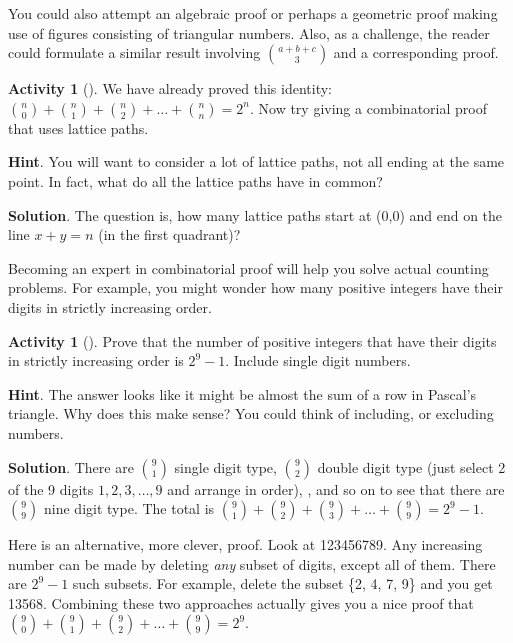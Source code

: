 \documentclass[10pt,]{book}
\theoremstyle{plain}
\theoremstyle{definition}
\theoremstyle{definition}
\theoremstyle{definition}
\newtheorem{activity}[project]{Activity}
\numberwithin{equation}{chapter}
\begin{document}
\hypertarget{p-686}{}%
You could also attempt an algebraic proof or perhaps a geometric proof making use of figures consisting of triangular numbers. Also, as a challenge, the reader could formulate a similar result involving \(\binom{a + b + c}{3}\) and a corresponding proof.%
\begin{activity}[]\label{activity-89}
\hypertarget{p-687}{}%
We have already proved this identity: \(\binom{n}{0} + \binom{n}{1} + \binom{n}{2} + \ldots + \binom{n}{n} = 2^{n}\).  Now try giving a combinatorial proof that uses lattice paths.%
\par\smallskip%
\noindent\textbf{Hint}.\hypertarget{hint-50}{}\quad%
\hypertarget{p-688}{}%
You will want to consider a lot of lattice paths, not all ending at the same point.  In fact, what do all the lattice paths have in common?%
\par\smallskip%
\noindent\textbf{Solution}.\hypertarget{solution-44}{}\quad%
\hypertarget{p-689}{}%
The question is, how many lattice paths start at (0,0) and end on the line \(x+y=n\) (in the first quadrant)?%
\end{activity}
\hypertarget{p-690}{}%
Becoming an expert in combinatorial proof will help you solve actual counting problems.  For example, you might wonder how many positive integers have their digits in strictly increasing order.%
\begin{activity}[]\label{activity-90}
\hypertarget{p-691}{}%
Prove that the number of positive integers that have their digits in strictly increasing order is \(2^{9} - 1\). Include single digit numbers.%
\par\smallskip%
\noindent\textbf{Hint}.\hypertarget{hint-51}{}\quad%
\hypertarget{p-692}{}%
The answer looks like it might be almost the sum of a row in Pascal's triangle.  Why does this make sense?  You could think of including, or excluding numbers.%
\par\smallskip%
\noindent\textbf{Solution}.\hypertarget{solution-45}{}\quad%
\hypertarget{p-693}{}%
There are \(\binom{9}{1}\) single digit type, \(\binom{9}{2}\) double digit type (just select 2 of the 9 digits \(1, 2, 3, \ldots, 9\) and arrange in order), \textellipsis{}, and so on to see that there are \(\binom{9}{9}\) nine digit type. The total is \(\binom{9}{1} + \binom{9}{2} + \binom{9}{3} + \ldots + \binom{9}{9} = 2^{9} - 1\).%
\par
\hypertarget{p-694}{}%
Here is an alternative, more clever, proof. Look at 123456789. Any increasing number can be made by deleting \emph{any} subset of digits, except all of them. There are \(2^{9} - 1\) such subsets. For example, delete the subset \{2, 4, 7, 9\} and you get 13568. Combining these two approaches actually gives you a nice proof that \(\binom{9}{0} + \binom{9}{1} + \binom{9}{2} + \ldots + \binom{9}{9} = 2^{9}\).%
\end{activity}
\end{document}
